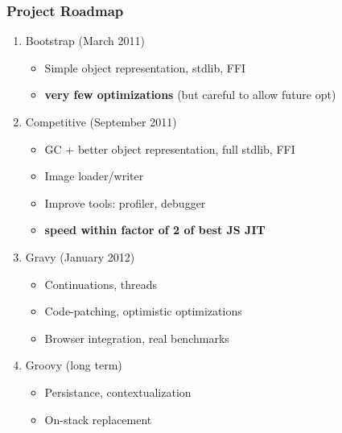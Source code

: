 \begin{frame}
\frametitle{\bf Project Roadmap}
    \begin{enumerate}[1.]

        \item Bootstrap (March 2011)
        \begin{itemize}
            \item Simple object representation, stdlib, FFI
            \item {\bf very few optimizations} (but careful to allow future opt)
        \end{itemize}

        \item Competitive (September 2011)
        \begin{itemize}
            \item GC + better object representation, full stdlib, FFI
            \item Image loader/writer
            \item Improve tools: profiler, debugger
            \item {\bf speed within factor of 2 of best JS JIT}
        \end{itemize}

        \item Gravy (January 2012)
        \begin{itemize}
            \item Continuations, threads
            \item Code-patching, optimistic optimizations
            \item Browser integration, real benchmarks
        \end{itemize}

        \item Groovy (long term)
        \begin{itemize}
            \item Persistance, contextualization
            \item On-stack replacement
        \end{itemize}
    \end{enumerate}
\end{frame}
